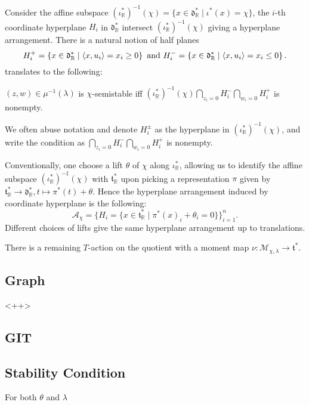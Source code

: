 \documentclass[b5paper]{article}
\begin{document}
Consider the affine subspace $ (\iota_{\mathbb{R}}^*)^{-1}(\chi) = \{ x \in \mathfrak{d}_{\mathbb{R}}^* \mid \iota^*(x) = \chi \} $, the $i$-th coordinate hyperplane $H_i$ in $\mathfrak{d}_\mathbb{R}^*$ intersect $(\iota_{\mathbb{R}}^*)^{-1}(\chi)$ giving a hyperplane arrangement. There is a natural notion of half planes 
\[
H_i^+=\left\{x\in \mathfrak{d}^*_\mathbb{R}\mid \langle x,u_i\rangle=x_i\geq 0\right\}
\textnormal{ and }
H_i^-=\left\{x\in \mathfrak{d}^*_\mathbb{R}\mid \langle x,u_i\rangle=x_i\leq 0\right\}.
\]
 translates to the following:

\begin{lemma}[lem:]{}
  $(z,w)\in \mu^{-1}(\lambda)$ is $\chi$-semistable iff $(\iota_{\mathbb{R}}^*)^{-1}(\chi)\bigcap _{z_i=0}H_i^-\bigcap _{w_i=0}H_i^+$ is nonempty. 
  \begin{remark}
    We often abuse notation and denote $H_i^{\pm}$ as the hyperplane in $(\iota^*_{\mathbb{R}})^{-1}(\chi)$, and write the condition as $\bigcap _{z_i=0}H_i^-\bigcap _{w_i=0}H_i^+$ is nonempty. 
  \end{remark}
\end{lemma}

Conventionally, one choose a lift $\theta$ of $\chi$ along $\iota_\mathbb{R}^*$, allowing us to identify the affine subspace $(\iota_{\mathbb{R}}^*)^{-1}(\chi)$ with $\mathfrak{t}_\mathbb{R}^*$ upon picking a representation $\pi$ given by $\mathfrak{t}^*_\mathbb{R}\rightarrow \mathfrak{d}_\mathbb{R}^*, t\mapsto \pi^*(t)+\theta$. Hence the hyperplane arrangement induced by coordinate hyperplane is the following:
\begin{equation*}
    \mathcal{A}_\chi = \{ H_i = \{ x \in \mathfrak{t}_{\mathbb{R}}^* \mid \pi^*(x)_i + \theta_i = 0\} \}_{i=1}^n.
\end{equation*}
Different choices of lifts give the same hyperplane arrangement up to translations.

There is a remaining $T$-action on the quotient with a moment map $ \nu : \mathcal{M}_{\chi, \lambda} \to \mathfrak{t}^* $.

\subsection{Graph}

<++>

\subsection{GIT}
\subsection{Stability Condition}
For both $\theta$ and $\lambda$
\end{document}
